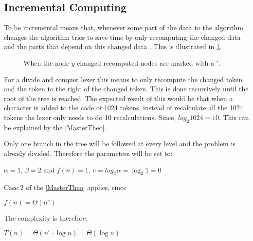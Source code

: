 \subsection{Incremental Computing}
To be incremental means that, whenever some part of the data to the algorithm
changes the algorithm tries to save time by only recomputing the changed data
and the parts that depend on this changed data \cite{incrementalDef}. This is
illustrated in \cref{fig:incUp}.

\begin{figure}[!htp]
\centering
\caption{When the node $y$ changed recomputed nodes are marked with a $'$. \label{fig:incUp}}
\end{figure}

For a divide and conquer lexer this means to only recompute the changed token
and the token to the right of the changed token. This is done recursively until
the root of the tree is reached. The expected result of this would be that when
a character is added to the code of 1024 tokens, instead of recalculate all the 
1024 tokens the lexer only needs to do 10 recalculations. Since,
$log_2 1024 = 10$. This can be explained by the \cref{MasterTheo}.

Only one branch in the tree will be followed at every level and the problem is
already divided. Therefore the parameters will be set to:
\begin{center}
$\alpha = 1$, $\beta = 2$ and $f(n) = 1$.
$e=log_\beta\alpha=\log_2 1=0$
\end{center}
Case 2 of the \cref{MasterTheo} applies, since
\begin{center}
$f(n) = \Theta(n^e)$
\end{center}
The complexity is therefore:
\begin{center}
$T(n) = \Theta(n^e \cdot \log n) = \Theta(\log n)$
\end{center}

